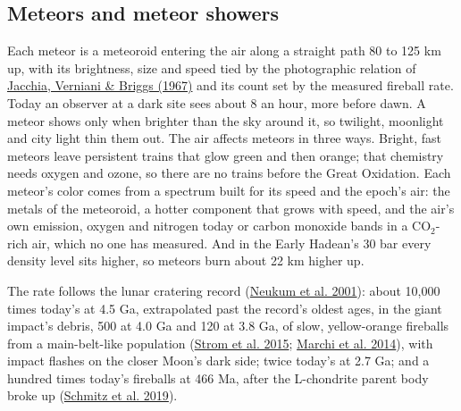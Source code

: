 \documentclass[9pt,twocolumn]{extarticle}
\begin{document}
\subsection{Meteors and meteor showers}\label{meteors-and-meteor-showers}

Each meteor is a meteoroid entering the air along a straight path 80 to 125 km up, with its brightness, size and speed tied by the photographic relation of \protect\hyperlink{cite.jacchia1967}{Jacchia, Verniani \& Briggs (1967)} and its count set by the measured fireball rate. Today an observer at a dark site sees about 8 an hour, more before dawn. A meteor shows only when brighter than the sky around it, so twilight, moonlight and city light thin them out. The air affects meteors in three ways. Bright, fast meteors leave persistent trains that glow green and then orange; that chemistry needs oxygen and ozone, so there are no trains before the Great Oxidation. Each meteor's color comes from a spectrum built for its speed and the epoch's air: the metals of the meteoroid, a hotter component that grows with speed, and the air's own emission, oxygen and nitrogen today or carbon monoxide bands in a CO$_2$-rich air, which no one has measured. And in the Early Hadean's 30 bar every density level sits higher, so meteors burn about 22 km higher up.

The rate follows the lunar cratering record (\protect\hyperlink{cite.neukum2001}{Neukum et al. 2001}): about 10,000 times today's at 4.5 Ga, extrapolated past the record's oldest ages, in the giant impact's debris, 500 at 4.0 Ga and 120 at 3.8 Ga, of slow, yellow-orange fireballs from a main-belt-like population (\protect\hyperlink{cite.strom2015}{Strom et al. 2015}; \protect\hyperlink{cite.marchi2014}{Marchi et al. 2014}), with impact flashes on the closer Moon's dark side; twice today's at 2.7 Ga; and a hundred times today's fireballs at 466 Ma, after the L-chondrite parent body broke up (\protect\hyperlink{cite.schmitz2019}{Schmitz et al. 2019}).
\end{document}
